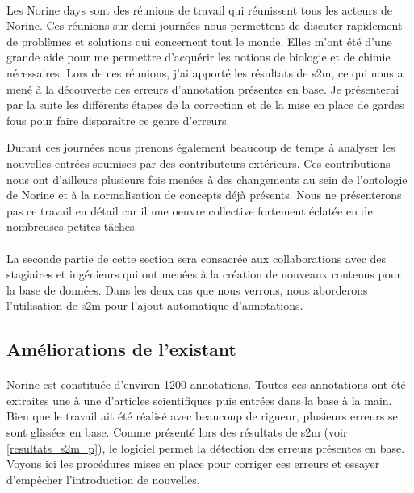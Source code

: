 \documentclass[12pt,french,twoside]{report}
\begin{document}
\paragraph{}Les Norine days sont des réunions de travail qui réunissent tous les acteurs de Norine.
Ces réunions sur demi-journées nous permettent de discuter rapidement de problèmes et solutions qui concernent tout le monde.
Elles m'ont été d'une grande aide pour me permettre d'acquérir les notions de biologie et de chimie nécessaires.
Lors de ces réunions, j'ai apporté les résultats de s2m, ce qui nous a mené à la découverte des erreurs d'annotation présentes en base.
Je présenterai par la suite les différents étapes de la correction et de la mise en place de gardes fous pour faire disparaître ce genre d'erreurs.

Durant ces journées nous prenons également beaucoup de temps à analyser les nouvelles entrées soumises par des contributeurs extérieurs.
Ces contributions nous ont d'ailleurs plusieurs fois menées à des changements au sein de l'ontologie de Norine et à la normalisation de concepts déjà présents.
Nous ne présenterons pas ce travail en détail car il une oeuvre collective fortement éclatée en de nombreuses petites tâches.

\paragraph{}La seconde partie de cette section sera consacrée aux collaborations avec des stagiaires et ingénieurs qui ont menées à la création de nouveaux contenus pour la base de données.
Dans les deux cas que nous verrons, nous aborderons l'utilisation de s2m pour l'ajout automatique d'annotations.


\subsection{Améliorations de l'existant}

\paragraph{}Norine est constituée d'environ 1200 annotations.
Toutes ces annotations ont été extraites une à une d'articles scientifiques puis entrées dans la base à la main.
Bien que le travail ait été réalisé avec beaucoup de rigueur, plusieurs erreurs se sont glissées en base.
Comme présenté lors des résultats de s2m (voir \ref{resultats_s2m_p}), le logiciel permet la détection des erreurs présentes en base.
Voyons ici les procédures mises en place pour corriger ces erreurs et essayer d'empêcher l'introduction de nouvelles.
\end{document}
